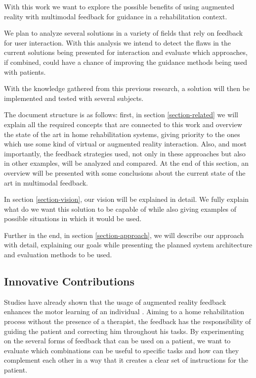 With this work we want to explore the possible benefits of using augmented reality with multimodal 
feedback for guidance in a rehabilitation context.

We plan to analyze several solutions in a variety of fields that rely on feedback for user interaction.
With this analysis we intend to detect the flaws in the current solutions being presented for interaction 
and evaluate which approaches, if combined, could have a chance of improving 
the guidance methods being used with patients.

With the knowledge gathered from this previous research, a solution will then be implemented and tested with several subjects. 

The document structure is as follows: first, in section \ref{section-related} we will 
explain all the required concepts that are connected to 
this work and overview the state of the art in home rehabilitation systems, giving priority to 
the ones which use some kind of virtual or augmented reality interaction. Also, and most importantly, the feedback strategies used,
not only in these approaches but also in other examples, will be analyzed and compared. 
At the end of this section, an overview will be presented with some conclusions about the current state of the art in multimodal feedback.

In section \ref{section-vision}, our vision will be explained in detail. We fully explain what do we want this solution to be capable of while also giving examples of possible situations in which it would be used.

Further in the end, in section \ref{section-approach}, we will describe our approach with detail, explaining our goals 
while presenting the planned system architecture and evaluation methods to be used.
\subsection{Innovative Contributions}

Studies have already shown that the usage of augmented reality feedback enhances the motor learning of an individual \cite{Sigrist2013}.
Aiming to a home rehabilitation process without the presence of a therapist,
the feedback has the responsibility of guiding the patient and correcting him throughout his tasks.
By experimenting on the several forms of feedback that can be used on a patient, we want to evaluate which 
combinations can be useful to specific tasks and how can they complement each other 
in a way that it creates a clear set of instructions for the patient. 

